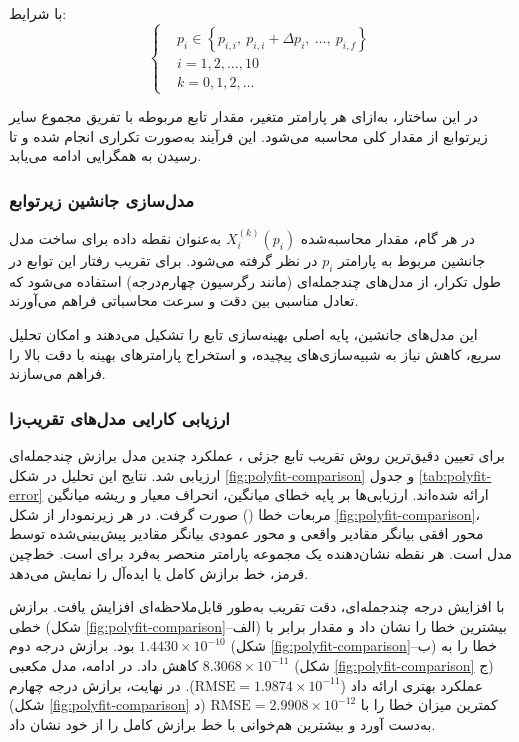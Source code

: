 با شرایط:
\[
\left\{
\begin{aligned}
& p_i \in \left\{p_{i,i},\ p_{i,i}+\Delta p_i,\ \ldots,\ p_{i,f} \right\} \\
& i = 1,2,\ldots,10 \\
& k = 0,1,2,\ldots
\end{aligned}
\right.
\]

در این ساختار، به‌ازای هر پارامتر متغیر، مقدار تابع مربوطه با تفریق مجموع سایر زیرتوابع از مقدار کلی  محاسبه می‌شود. این فرآیند به‌صورت تکراری انجام شده و تا رسیدن به همگرایی ادامه می‌یابد.


\subsubsection{مدل‌سازی جانشین زیرتوابع}

در هر گام، مقدار محاسبه‌شده $X_i^{(k)}(p_i)$ به‌عنوان نقطه داده برای ساخت مدل جانشین مربوط به پارامتر $p_i$ در نظر گرفته می‌شود. برای تقریب رفتار این توابع در طول تکرار، از مدل‌های چندجمله‌ای (مانند رگرسیون چهارم‌درجه) استفاده می‌شود که تعادل مناسبی بین دقت و سرعت محاسباتی فراهم می‌آورند.

این مدل‌های جانشین، پایه اصلی بهینه‌سازی تابع  را تشکیل می‌دهند و امکان تحلیل سریع، کاهش نیاز به شبیه‌سازی‌های پیچیده، و استخراج پارامترهای بهینه با دقت بالا را فراهم می‌سازند.


\subsubsection{ارزیابی کارایی مدل‌های تقریب‌زا}

برای تعیین دقیق‌ترین روش تقریب تابع جزئی ، عملکرد چندین مدل برازش چندجمله‌ای ارزیابی شد. نتایج این تحلیل در شکل \ref{fig:polyfit-comparison} و جدول \ref{tab:polyfit-error} ارائه شده‌اند. ارزیابی‌ها بر پایه خطای میانگین، انحراف معیار و ریشه میانگین مربعات خطا () صورت گرفت. در هر زیرنمودار از شکل \ref{fig:polyfit-comparison}، محور افقی بیانگر مقادیر واقعی  و محور عمودی بیانگر مقادیر پیش‌بینی‌شده توسط مدل است. هر نقطه نشان‌دهنده یک مجموعه پارامتر منحصر به‌فرد برای  است. خط‌چین قرمز، خط برازش کامل یا ایده‌آل را نمایش می‌دهد.

با افزایش درجه چندجمله‌ای، دقت تقریب به‌طور قابل‌ملاحظه‌ای افزایش یافت. برازش خطی (شکل \ref{fig:polyfit-comparison}–الف) بیشترین خطا را نشان داد و مقدار  برابر با $1.4430\times10^{-10}$ بود. برازش درجه دوم (شکل \ref{fig:polyfit-comparison}–ب) خطا را به $8.3068\times10^{-11}$ کاهش داد. در ادامه، مدل مکعبی (شکل \ref{fig:polyfit-comparison} ج) عملکرد بهتری ارائه داد ($\mathrm{RMSE}=1.9874\times10^{-11}$). در نهایت، برازش درجه چهارم (شکل \ref{fig:polyfit-comparison} د) کمترین میزان خطا را با $\mathrm{RMSE}=2.9908\times10^{-12}$ به‌دست آورد و بیشترین هم‌خوانی با خط برازش کامل را از خود نشان داد.

